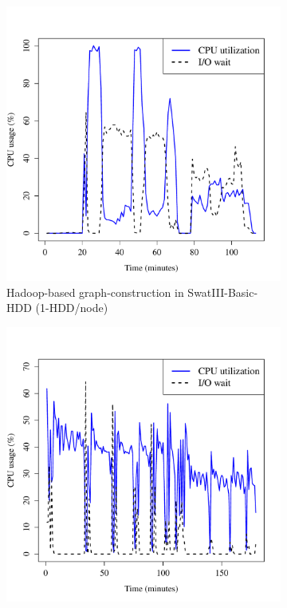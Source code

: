 \documentclass[conference]{IEEEtran}
\begin{document}
\begin{figure}[htb]
        \begin{subfigure}[b]{0.23\textwidth}
                \includegraphics[width=\textwidth]{Figure/SystemData/Plots/BGCPUHDD.pdf}
                \caption{Hadoop-based graph-construction in SwatIII-Basic-HDD (1-HDD/node)}
                \label{fig:BGCPUHDD}
        \end{subfigure}
		\begin{subfigure}[b]{0.23\textwidth}
                \includegraphics[width=\textwidth]{Figure/SystemData/Plots/ECCPUHDD.pdf}

\end{subfigure}
\end{figure}
\end{document}
